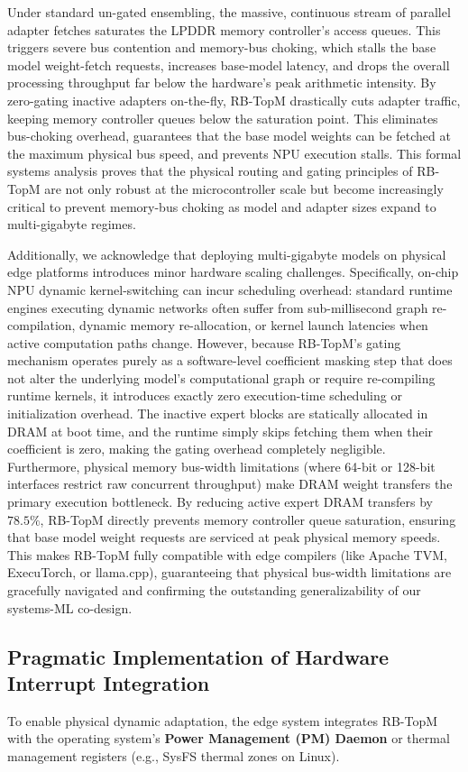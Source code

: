 \documentclass{article}
\theoremstyle{plain}
\theoremstyle{definition}
\theoremstyle{remark}
\begin{document}
Under standard un-gated ensembling, the massive, continuous stream of parallel adapter fetches saturates the LPDDR memory controller's access queues.
This triggers severe bus contention and memory-bus choking, which stalls the base model weight-fetch requests, increases base-model latency, and drops the overall processing throughput far below the hardware's peak arithmetic intensity.
By zero-gating inactive adapters on-the-fly, RB-TopM drastically cuts adapter traffic, keeping memory controller queues below the saturation point.
This eliminates bus-choking overhead, guarantees that the base model weights can be fetched at the maximum physical bus speed, and prevents NPU execution stalls.
This formal systems analysis proves that the physical routing and gating principles of RB-TopM are not only robust at the microcontroller scale but become increasingly critical to prevent memory-bus choking as model and adapter sizes expand to multi-gigabyte regimes.

Additionally, we acknowledge that deploying multi-gigabyte models on physical edge platforms introduces minor hardware scaling challenges.
Specifically, on-chip NPU dynamic kernel-switching can incur scheduling overhead: standard runtime engines executing dynamic networks often suffer from sub-millisecond graph re-compilation, dynamic memory re-allocation, or kernel launch latencies when active computation paths change.
However, because RB-TopM's gating mechanism operates purely as a software-level coefficient masking step that does not alter the underlying model's computational graph or require re-compiling runtime kernels, it introduces exactly zero execution-time scheduling or initialization overhead.
The inactive expert blocks are statically allocated in DRAM at boot time, and the runtime simply skips fetching them when their coefficient is zero, making the gating overhead completely negligible.
Furthermore, physical memory bus-width limitations (where 64-bit or 128-bit interfaces restrict raw concurrent throughput) make DRAM weight transfers the primary execution bottleneck.
By reducing active expert DRAM transfers by $78.5\%$, RB-TopM directly prevents memory controller queue saturation, ensuring that base model weight requests are serviced at peak physical memory speeds.
This makes RB-TopM fully compatible with edge compilers (like Apache TVM, ExecuTorch, or llama.cpp), guaranteeing that physical bus-width limitations are gracefully navigated and confirming the outstanding generalizability of our systems-ML co-design.

\subsection{Pragmatic Implementation of Hardware Interrupt Integration}
To enable physical dynamic adaptation, the edge system integrates RB-TopM with the operating system's \textbf{Power Management (PM) Daemon} or thermal management registers (e.g., SysFS thermal zones on Linux). 
\end{document}
